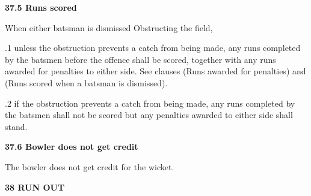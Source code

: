 \documentclass[12pt]{article}
\begin{document}
\vspace{\baselineskip}
{\fontsize{11pt}{13.2pt}\selectfont \textbf{37.5 \tabto{0.47in} Runs scored}\par}\par


\vspace{\baselineskip}
{\fontsize{9pt}{10.8pt}\selectfont When either batsman is dismissed Obstructing the field,\par}\par


\vspace{\baselineskip}
\begin{adjustwidth}{0.5in}{0.03in}
{\fontsize{9pt}{10.8pt}.1 \tabto{0.49in} unless the obstruction prevents a catch from being made, any runs completed by the batsmen before the offence shall be scored, together with any runs awarded for penalties to either side. See clauses (Runs awarded for penalties) and (Runs scored when a batsman is dismissed).\par}\par

\end{adjustwidth}


\vspace{\baselineskip}
\begin{adjustwidth}{0.5in}{0.03in}
{\fontsize{9pt}{10.8pt}.2 \tabto{0.49in} if the obstruction prevents a catch from being made, any runs completed by the batsmen shall not be scored but any penalties awarded to either side shall stand.\par}\par

\end{adjustwidth}


\vspace{\baselineskip}
{\fontsize{11pt}{13.2pt}\selectfont \textbf{37.6 \tabto{0.47in} Bowler does not get credit}\par}\par


\vspace{\baselineskip}
{\fontsize{9pt}{10.8pt}\selectfont The bowler does not get credit for the wicket.\par}\par


\vspace{\baselineskip}
{\fontsize{16pt}{19.2pt}\selectfont \textbf{38 RUN OUT}\par}\par
\end{document}
